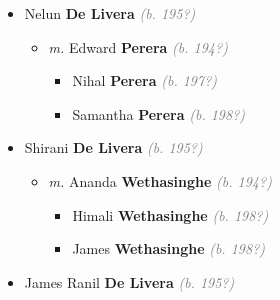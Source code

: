 \documentclass[10pt, openany]{book}
\begin{document}
\begin{itemize}
{\begin{itemize}
{\begin{itemize}
{\begin{itemize}
{\begin{itemize}
{\begin{itemize}
{\begin{itemize}
{\begin{itemize}
{\begin{itemize}
{\begin{itemize}
\item{Bianca \textbf{De Livera} \textcolor{gray}{\textit{(b. 201?)}}
  }
\item{Cooper Adrian \textbf{De Livera} \textcolor{gray}{\textit{(b. 202?)}}
   }
\end{itemize}}
\end{itemize}
  }
\end{itemize}}
\end{itemize}
  }
\item{Nelun \textbf{De Livera} \textcolor{gray}{\textit{(b. 195?)}}
\begin{itemize}
\item{\textit{m.} Edward \textbf{Perera} \textcolor{gray}{\textit{(b. 194?)}}   \label{couple:00002283:00002284} \begin{itemize}
\item{Nihal \textbf{Perera} \textcolor{gray}{\textit{(b. 197?)}}
 }
\item{Samantha \textbf{Perera} \textcolor{gray}{\textit{(b. 198?)}}
 }
\end{itemize}}
\end{itemize}
  }
\item{Shirani \textbf{De Livera} \textcolor{gray}{\textit{(b. 195?)}}
\begin{itemize}
\item{\textit{m.} Ananda \textbf{Wethasinghe} \textcolor{gray}{\textit{(b. 194?)}}   \label{couple:00002288:00002289} \begin{itemize}
\item{Himali \textbf{Wethasinghe} \textcolor{gray}{\textit{(b. 198?)}}
 }
\item{James \textbf{Wethasinghe} \textcolor{gray}{\textit{(b. 198?)}}
 }
\end{itemize}}
\end{itemize}
  }
\item{James Ranil \textbf{De Livera} \textcolor{gray}{\textit{(b. 195?)}}
   }
\end{itemize}}
\end{itemize}
    }
\end{itemize}}

\end{itemize}}
\end{itemize}}
\end{itemize}
\end{document}
